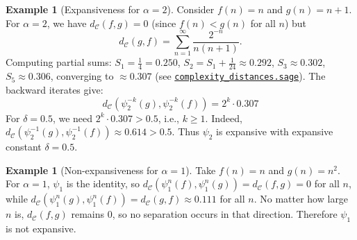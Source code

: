\documentclass[11pt,a4paper]{article}
\newcommand{\repourl}{https://github.com/guydev42/expansive-homeomorphisms-complexity-qmetric}
\theoremstyle{plain}
\theoremstyle{definition}
\newtheorem{exampleinner}[theoreminner]{Example}
\newenvironment{example}[1][]{\begin{exampleinner}[#1]}{\end{exampleinner}}
\newcommand{\C}{\mathcal{C}}
\begin{document}
\begin{example}[Expansiveness for $\alpha=2$]\label{ex:expansive-alpha2}
Consider $f(n)=n$ and $g(n)=n+1$. For $\alpha=2$, we have $d_\C(f,g)=0$
(since $f(n)<g(n)$ for all $n$) but
\[
  d_\C(g,f)=\sum_{n=1}^\infty
  \frac{2^{-n}}{n(n+1)}.
\]
Computing partial sums: $S_1=\frac{1}{4}=0.250$,
$S_2=S_1+\frac{1}{24}\approx 0.292$,
$S_3\approx 0.302$, $S_5\approx 0.306$, converging to
$\approx 0.307$
(see \href{\repourl/blob/main/code/sagemath/complexity_distances.sage}{\texttt{complexity\_distances.sage}}).
The backward iterates give:
\[
d_\C(\psi_2^{-k}(g),\psi_2^{-k}(f)) = 2^k \cdot 0.307
\]
For $\delta=0.5$, we need $2^k \cdot 0.307 > 0.5$, i.e., $k \geq 1$.
Indeed, $d_\C(\psi_2^{-1}(g),\psi_2^{-1}(f)) \approx 0.614 > 0.5$.
Thus $\psi_2$ is expansive with expansive constant $\delta=0.5$.
\end{example}

\begin{example}[Non-expansiveness for $\alpha=1$]\label{ex:non-expansive-alpha1}
Take $f(n)=n$ and $g(n)=n^2$. For $\alpha=1$, $\psi_1$ is the identity, 
so $d_\C(\psi_1^n(f),\psi_1^n(g)) = d_\C(f,g)=0$ for all $n$, 
while $d_\C(\psi_1^n(g),\psi_1^n(f)) = d_\C(g,f)\approx 0.111$ for all $n$.
No matter how large $n$ is, $d_\C(f,g)$ remains $0$, so no separation occurs 
in that direction. Therefore $\psi_1$ is not expansive.
\end{example}
\end{document}
